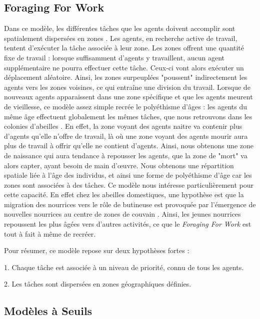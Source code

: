		\subsection{Foraging For Work}
        Dans ce modèle, les différentes tâches que les agents doivent accomplir sont spatialement dispersées en zones \cite{franks_foraging_1994}. Les agents, en recherche active de travail, tentent d'exécuter la tâche associée à leur zone. Les zones offrent une quantité fixe de travail : lorsque suffisamment d'agents y travaillent, aucun agent supplémentaire ne pourra effectuer cette tâche. Ceux-ci vont alors exécuter un déplacement aléatoire. Ainsi, les zones surpeuplées "poussent" indirectement les agents vers les zones voisines, ce qui entraîne une division du travail. Lorsque de nouveaux agents apparaissent dans une zone spécifique et que les agents meurent de vieillesse, ce modèle assez simple recrée le polyéthisme d'âges : les agents du même âge effectuent globalement les mêmes tâches, que nous retrouvons dans les colonies d'abeilles \cite{seeley_age_1991}. En effet, la zone voyant des agents naitre va contenir plus d'agents qu'elle n'offre de travail, là où une zone voyant des agents mourir aura plus de travail à offrir qu'elle ne contient d'agents. Ainsi, nous obtenons une zone de naissance qui aura tendance à repousser les agents, que la zone de "mort" va alors capter, ayant besoin de main d'œuvre. Nous obtenons une répartition spatiale liée à l'âge des individus, et ainsi une forme de polyéthisme d'âge car les zones sont associées à des tâches. Ce modèle nous intéresse particulièrement pour cette capacité. En effet chez les abeilles domestiques, une hypothèse est que la migration des nourrices vers le rôle de butineuse est provoquée par l'émergence de nouvelles nourrices au centre de zones de couvain  \cite{seeley_age_1991}. Ainsi, les jeunes nourrices repoussent les plus âgées vers d'autres activités, ce que le \textit{Foraging For Work} est tout à fait à même de recréer.
        
        Pour résumer, ce modèle repose sur deux hypothèses fortes :
        
        1. Chaque tâche est associée à un niveau de priorité, connu de tous les agents.
        
        2. Les tâches sont dispersées en zones géographiques définies.
        
        
		\subsection{Modèles à Seuils}
		\label{subsectionRTM}
